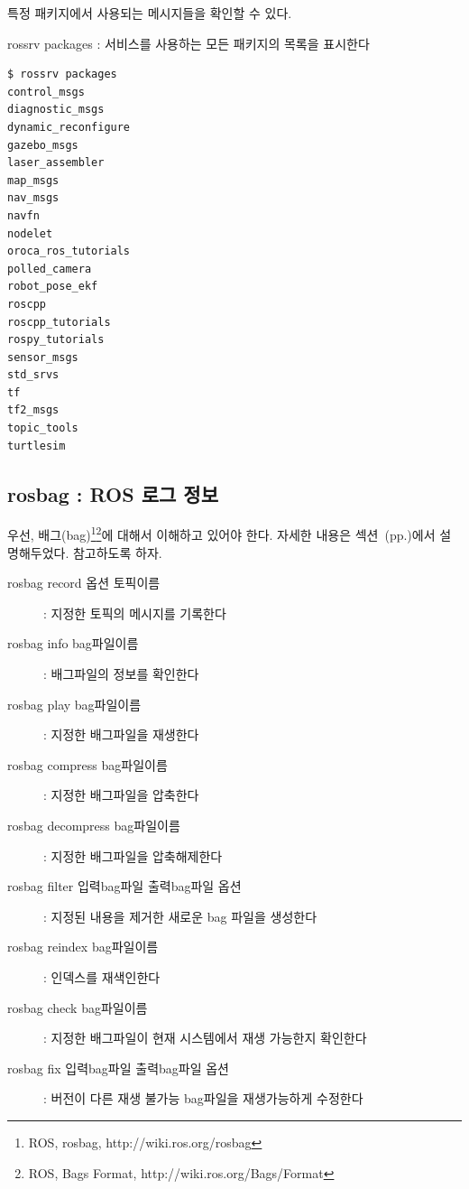 \noindent
특정 패키지에서 사용되는 메시지들을 확인할 수 있다.

\vspace{\baselineskip}
\noindent
{}\circled{\thenum} rossrv packages : 서비스를 사용하는 모든 패키지의 목록을 표시한다

\begin{lstlisting}[language=ROS]
$ rossrv packages
control_msgs
diagnostic_msgs
dynamic_reconfigure
gazebo_msgs
laser_assembler
map_msgs
nav_msgs
navfn
nodelet
oroca_ros_tutorials
polled_camera
robot_pose_ekf
roscpp
roscpp_tutorials
rospy_tutorials
sensor_msgs
std_srvs
tf
tf2_msgs
topic_tools
turtlesim
\end{lstlisting}

\subsection{rosbag : ROS 로그 정보}

우선, 배그(bag)\footnote{ROS, rosbag, http://wiki.ros.org/rosbag}\footnote{ROS, Bags Format, http://wiki.ros.org/Bags/Format}에 대해서 이해하고 있어야 한다. 자세한 내용은 섹션~(pp.\pageref{def:RosBag})에서 설명해두었다. 참고하도록 하자.

\vspace{\baselineskip}
\noindent
\begin{description}
\item[rosbag record 옵션 토픽이름] : 지정한 토픽의 메시지를 기록한다
\item[rosbag info bag파일이름] : 배그파일의 정보를 확인한다
\item[rosbag play bag파일이름] : 지정한 배그파일을 재생한다

\item[rosbag compress bag파일이름] : 지정한 배그파일을 압축한다
\item[rosbag decompress bag파일이름] : 지정한 배그파일을 압축해제한다

\item[rosbag filter 입력bag파일 출력bag파일 옵션] : 지정된 내용을 제거한 새로운 bag 파일을 생성한다
\item[rosbag reindex bag파일이름] : 인덱스를 재색인한다

\item[rosbag check bag파일이름] : 지정한 배그파일이 현재 시스템에서 재생 가능한지 확인한다
\item[rosbag fix 입력bag파일 출력bag파일 옵션] : 버전이 다른 재생 불가능 bag파일을 재생가능하게 수정한다
\end{description}

